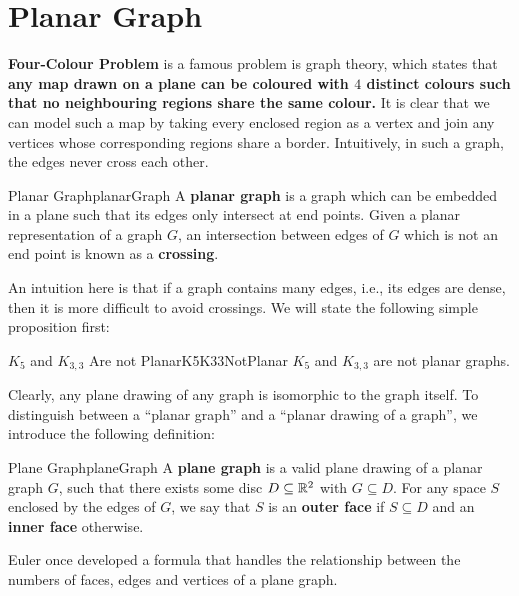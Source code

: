 \documentclass[math]{amznotes}
\theoremstyle{remark}
\begin{document}
\section{Planar Graph}
\textbf{Four-Colour Problem} is a famous problem is graph theory, which states that \textbf{any map drawn on a plane can be coloured with $4$ distinct colours such that no neighbouring regions share the same colour.} It is clear that we can model such a map by taking every enclosed region as a vertex and join any vertices whose corresponding regions share a border. Intuitively, in such a graph, the edges never cross each other.
\begin{dfnbox}{Planar Graph}{planarGraph}
    A {\color{red} \textbf{planar graph}} is a graph which can be embedded in a plane such that its edges only intersect at end points. Given a planar representation of a graph $G$, an intersection between edges of $G$ which is not an end point is known as a {\color{red} \textbf{crossing}}.
\end{dfnbox}
An intuition here is that if a graph contains many edges, i.e., its edges are dense, then it is more difficult to avoid crossings. We will state the following simple proposition first:
\begin{probox}{$K_5$ and $K_{3, 3}$ Are not Planar}{K5K33NotPlanar}
    $K_5$ and $K_{3, 3}$ are not planar graphs.
\end{probox}
Clearly, any plane drawing of any graph is isomorphic to the graph itself. To distinguish between a ``planar graph'' and a ``planar drawing of a graph'', we introduce the following definition:
\begin{dfnbox}{Plane Graph}{planeGraph}
    A {\color{red} \textbf{plane graph}} is a valid plane drawing of a planar graph $G$, such that there exists some disc $D \subseteq \mathbb{R}^2$ with $G \subseteq D$. For any space $S$ enclosed by the edges of $G$, we say that $S$ is an {\color{red} \textbf{outer face}} if $S \subseteq D$ and an {\color{red} \textbf{inner face}} otherwise.
\end{dfnbox}
Euler once developed a formula that handles the relationship between the numbers of faces, edges and vertices of a plane graph.
\end{document}
